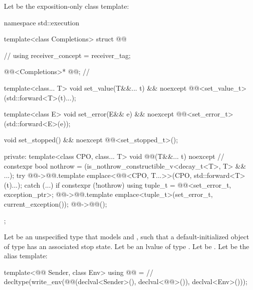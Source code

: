 \pnum
Let  be the exposition-only class template:

%
\begin{codeblock}
namespace std::execution {
  template<class Completions>
  struct @@ {                                // \expos
    using receiver_concept = receiver_tag;

    @@<Completions>* @@;                // \expos

    template<class... T>
      void set_value(T&&... t) && noexcept {
        @@<set_value_t>(std::forward<T>(t)...);
      }

    template<class E>
      void set_error(E&& e) && noexcept {
        @@<set_error_t>(std::forward<E>(e));
      }

    void set_stopped() && noexcept {
      @@<set_stopped_t>();
    }

  private:
    template<class CPO, class... T>
      void @@(T&&... t) noexcept {                    // \expos
        constexpr bool nothrow = (is_nothrow_constructible_v<decay_t<T>, T> && ...);
        try {
          @@->@@.template emplace<@@<CPO, T...>>(CPO{},
                                                                   std::forward<T>(t)...);
        }
        catch (...) {
          if constexpr (!nothrow) {
            using tuple_t = @@<set_error_t, exception_ptr>;
            @@->@@.template emplace<tuple_t>(set_error_t{}, current_exception());
          }
        }
        @@->@@();
      }
  };
}
\end{codeblock}

\pnum
Let  be an unspecified type
that models  and ,
such that a default-initialized object of type 
has an associated stop state.
Let  be an lvalue of type .
Let  be .
Let  be the alias template:

\begin{codeblock}
template<@@ Sender, class Env>
using @@ =                                   // \expos
  decltype(write_env(@@(declval<Sender>(), declval<@@>()), declval<Env>()));
\end{codeblock}

